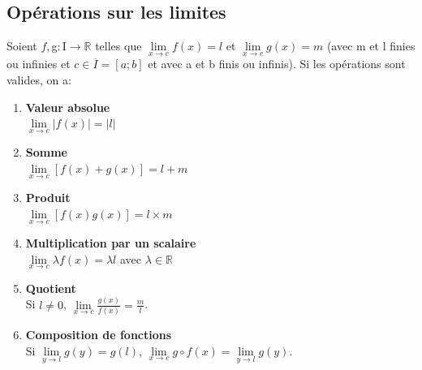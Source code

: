 \documentclass[a4paper,10pt]{book} %
\newcommand{\R}{\mathbb{R}}
\begin{document}
\subsection{Opérations sur les limites}
Soient $f, $g$ : $I$ \rightarrow \R$ telles que $\lim\limits_{x\rightarrow c} f(x)=l$ et $\lim\limits_{x\rightarrow c} g(x)=m$
(avec m et l finies ou infinies et $c \in \overline{I}=[a;b]$ et avec a et b finis ou infinis). Si les opérations sont valides, on a:
\begin{enumerate}
\item\textbf{Valeur absolue}\\
$\lim\limits_{x\rightarrow c}|f(x)|=|l|$\\

\item \textbf{Somme}\\
$\lim\limits_{x\rightarrow c} [f(x)+g(x)]=l+m$\\

\item\textbf{Produit}\\
$\lim\limits_{x\rightarrow c} [f(x)g(x)]=l\times m$\\

\item\textbf{Multiplication par un scalaire}\\
$\lim\limits_{x\rightarrow c} \lambda f(x)=\lambda l$ avec $\lambda\in \R$\\

\item\textbf{Quotient}\\
Si $l\neq 0$, $\lim\limits_{x\rightarrow c} \frac{g(x)}{f(x)}=\frac{m}{l}$.\\

\item\textbf{Composition de fonctions}\\
Si $\lim\limits_{y\rightarrow l}g(y)=g(l)$, $\lim\limits_{x\rightarrow c}g\circ f(x)=\lim\limits_{y \rightarrow l}g(y)$.
\end{enumerate}
\end{document}
